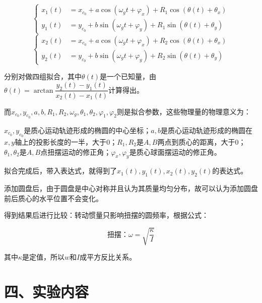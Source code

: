 \documentclass[11pt]{article}
\begin{document}
$$\left\{
\begin{aligned}
    x_1(t)&=x_{c_0}+a\cos(\omega_{g}t+\varphi_x)+R_1\cos(\theta(t)+\theta_x) \\
    y_1(t)&=y_{c_0}+b\sin(\omega_{g}t+\varphi_y)+R_1\sin(\theta(t)+\theta_y)
\end{aligned}
\right.$$
$$\left\{
\begin{aligned}
    x_2(t)&=x_{c_0}+a\cos(\omega_{g}t+\varphi_x)+R_2\cos(\theta(t)+\theta_x) \\
    y_2(t)&=y_{c_0}+b\sin(\omega_{g}t+\varphi_y)+R_2\sin(\theta(t)+\theta_y)
\end{aligned}
\right.$$

分别对做四组拟合，其中$\theta(t)$是一个已知量，由$\theta(t)=\arctan\dfrac{y_2(t)-y_1(t)}{x_2(t)-x_1(t)}$计算得出。

而$x_{c_0},y_{c_0},a,b,R_1,R_2,\omega_{g},\theta_1,\theta_2,\varphi_1,\varphi_2$则是拟合参数，这些物理量的物理意义为：

$x_{c_0},y_{c_0}$是质心运动轨迹形成的椭圆的中心坐标；$a,b$是质心运动轨迹形成的椭圆在$x,y$轴上的投影长度的一半，大于$0$；$R_1,R_2$是$A,B$两点到质心的距离，大于$0$；$\theta_1,\theta_2$是$A,B$点扭摆运动的修正角；$\varphi_x,\varphi_y$是质心球面摆运动的修正角。

拟合完成后，带入表达式，就得到了$x_1(t),y_1(t),x_2(t),y_2(t)$的表达式。

添加圆盘后，由于圆盘是中心对称并且认为其质量均匀分布，故可以认为添加圆盘前后质心的水平位置不会变化。

得到结果后进行比较：转动惯量只影响扭摆的圆频率，根据公式：

$$
\text{扭摆：}\omega=\sqrt{\dfrac{\kappa}{I}}
$$

其中$\kappa$是定值，所以$w$和$I$成平方反比关系。

\section*{四、实验内容}
\end{document}
